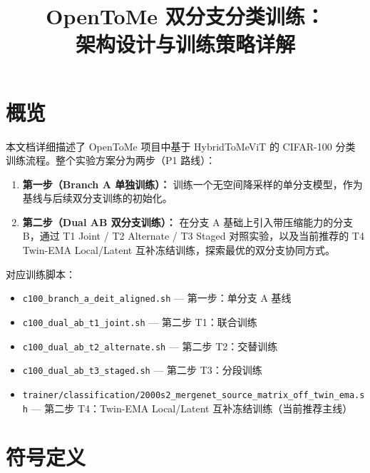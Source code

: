\documentclass[a4paper,11pt]{article}
\title{\textbf{OpenToMe 双分支分类训练：\\架构设计与训练策略详解}}
\author{}
\date{}
\begin{document}
\maketitle

\section{概览}

本文档详细描述了 OpenToMe 项目中基于 HybridToMeViT 的 CIFAR-100 分类训练流程。整个实验方案分为两步（P1 路线）：

\begin{enumerate}
    \item \textbf{第一步（Branch A 单独训练）：} 训练一个无空间降采样的单分支模型，作为基线与后续双分支训练的初始化。
    \item \textbf{第二步（Dual AB 双分支训练）：} 在分支 A 基础上引入带压缩能力的分支 B，通过 T1 Joint / T2 Alternate / T3 Staged 对照实验，以及当前推荐的 T4 Twin-EMA Local/Latent 互补冻结训练，探索最优的双分支协同方式。
\end{enumerate}

对应训练脚本：
\begin{itemize}
    \item \texttt{c100\_branch\_a\_deit\_aligned.sh} — 第一步：单分支 A 基线
    \item \texttt{c100\_dual\_ab\_t1\_joint.sh} — 第二步 T1：联合训练
    \item \texttt{c100\_dual\_ab\_t2\_alternate.sh} — 第二步 T2：交替训练
    \item \texttt{c100\_dual\_ab\_t3\_staged.sh} — 第二步 T3：分段训练
    \item \texttt{trainer/classification/2000s2\_mergenet\_source\_matrix\_off\_twin\_ema.sh} — 第二步 T4：Twin-EMA Local/Latent 互补冻结训练（当前推荐主线）
\end{itemize}

\section{符号定义}
\end{document}
